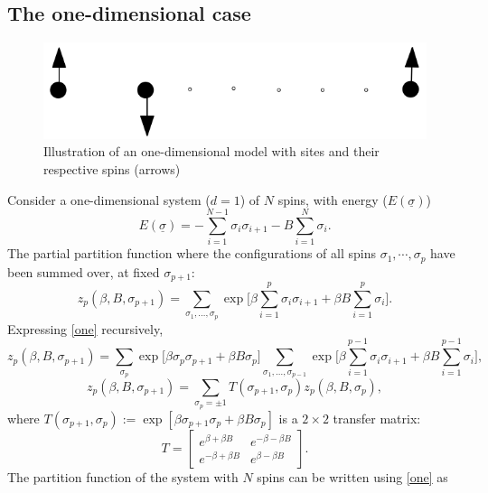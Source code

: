 \documentclass[letterpaper,english,10pt]{article}
\begin{document}
\subsection{The one-dimensional case}
\begin{figure}[hb]
\centering
\includegraphics[width=\textwidth]{Figures/oned.png}
\caption{Illustration of an one-dimensional model with sites and their respective spins (arrows)}
\end{figure}
Consider a one-dimensional system ($d=1$) of $N$ spins, with energy ($E(\underline{\sigma})$)
$$E(\underline{\sigma})=-\sum_{i=1}^{N-1}\sigma_{i}\sigma_{i+1}-B\sum_{i=1}^{N}\sigma_{i}.$$
The partial partition function where the configurations of all spins $\sigma_{1},\cdots,\sigma_{p}$ have been summed over, at fixed $\sigma_{p+1}$:
\begin{equation}
z_{p}(\beta,B,\sigma_{p+1})=\sum_{\sigma_{1},\hdots,\sigma_{p}}\exp\bigg[\beta\sum_{i=1}^{p}\sigma_{i}\sigma_{i+1}+\beta B \sum_{i=1}^{p}\sigma_{i}\bigg].
\label{one}
\end{equation}
Expressing \eqref{one} recursively,
$$z_{p}(\beta,B,\sigma_{p+1})=\sum_{\sigma_{p}}\exp\bigg[\beta \sigma_{p}\sigma_{p+1}+\beta B \sigma_{p}\bigg]\sum_{\sigma_{1},\hdots,\sigma_{p-1}}\exp\bigg[\beta\sum_{i=1}^{p-1}\sigma_{i}\sigma_{i+1}+\beta B \sum_{i=1}^{p-1}\sigma_{i}\bigg],$$
$$z_{p}(\beta,B,\sigma_{p+1})= \sum_{\sigma_{p}=\pm 1} T(\sigma_{p+1},\sigma_{p})z_{p}(\beta,B,\sigma_{p}),$$ 
where $T(\sigma_{p+1},\sigma_{p}):= \exp[\beta \sigma_{p+1} \sigma_{p}+\beta B \sigma_{p}]$ is a $2 \times 2$ transfer matrix:
$$T = 
\begin{bmatrix}
	e^{\beta+\beta B} & e^{-\beta-\beta B} \\
	e^{-\beta+\beta B} & e^{\beta-\beta B} 
	\end{bmatrix}.$$
The partition function of the system with $N$ spins can be written using \eqref{one} as
\end{document}
